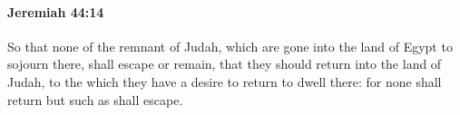 
		\paragraph{Jeremiah 44:14} %
			\label{JEREMIAH-44-14}

			So that none of the remnant of Judah, which are gone into the land of Egypt to sojourn there, shall escape or remain, that they should return into the land of Judah, to the which they have a desire to return to dwell there: for none shall return but such as shall escape.


